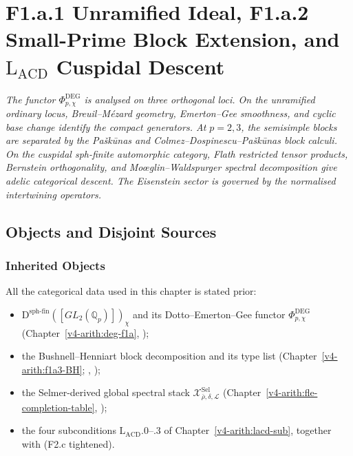 \chapter{F1.a.1 Unramified Ideal, F1.a.2 Small-Prime Block Extension, and \(\mathrm{L}_{\mathrm{ACD}}\) Cuspidal Descent}
\label{v4-arith:w5-e:chapter}

\emph{The functor \(\Phi^{\mathrm{DEG}}_{p,\chi}\) is analysed on three
orthogonal loci. On the unramified ordinary locus, Breuil--M{\'e}zard
geometry, Emerton--Gee smoothness, and cyclic base change identify the
compact generators. At \(p=2,3\), the semisimple blocks are separated by
the Pa{\v s}k{\=u}nas and Colmez--Dospinescu--Pa{\v s}k{\=u}nas block
calculi. On the cuspidal sph-finite automorphic category, Flath
restricted tensor products, Bernstein orthogonality, and
Mo{\oe}glin--Waldspurger spectral decomposition give adelic categorical
descent. The Eisenstein sector is governed by the normalised
intertwining operators.}

\section{Objects and Disjoint Sources}
\label{v4-arith:w5-e:domain}

\subsection{Inherited Objects}

All the categorical data used in this chapter is stated prior:
\begin{itemize}
\item \(\mathrm{D}^{\mathrm{sph\text{-}fin}}([GL_{2}(\mathbb{Q}_{p})])_{\chi}\)
and its Dotto--Emerton--Gee functor
\(\Phi^{\mathrm{DEG}}_{p,\chi}\) (Chapter~\ref{v4-arith:deg-f1a},
);
\item the Bushnell--Henniart block decomposition and its type
list (Chapter~\ref{v4-arith:f1a3-BH};
,
);
\item the Selmer-derived global spectral stack
\(\mathcal{X}^{\mathrm{Sel}}_{\bar\rho,\delta,\mathcal{L}}\)
(Chapter~\ref{v4-arith:fle-completion-table},
);
\item the four subconditions
\(\mathrm{L}_{\mathrm{ACD}}\).0--.3 of
Chapter~\ref{v4-arith:lacd-sub}, together with
 (F2.c tightened).
\end{itemize}

